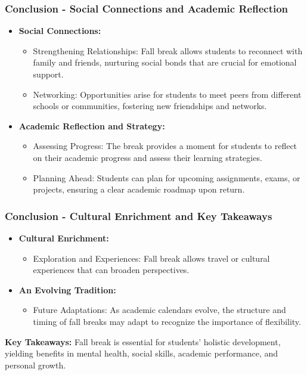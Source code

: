 \documentclass[aspectratio=169]{beamer}
\begin{document}
\begin{frame}[fragile]
    \frametitle{Conclusion - Social Connections and Academic Reflection}
    \begin{itemize}
        \item \textbf{Social Connections:}
        \begin{itemize}
            \item Strengthening Relationships: Fall break allows students to reconnect with family and friends, nurturing social bonds that are crucial for emotional support.
            \item Networking: Opportunities arise for students to meet peers from different schools or communities, fostering new friendships and networks.
        \end{itemize}
        
        \item \textbf{Academic Reflection and Strategy:}
        \begin{itemize}
            \item Assessing Progress: The break provides a moment for students to reflect on their academic progress and assess their learning strategies.
            \item Planning Ahead: Students can plan for upcoming assignments, exams, or projects, ensuring a clear academic roadmap upon return.
        \end{itemize}
    \end{itemize}
\end{frame}

\begin{frame}[fragile]
    \frametitle{Conclusion - Cultural Enrichment and Key Takeaways}
    \begin{itemize}
        \item \textbf{Cultural Enrichment:}
        \begin{itemize}
            \item Exploration and Experiences: Fall break allows travel or cultural experiences that can broaden perspectives.
        \end{itemize}
        
        \item \textbf{An Evolving Tradition:}
        \begin{itemize}
            \item Future Adaptations: As academic calendars evolve, the structure and timing of fall breaks may adapt to recognize the importance of flexibility.
        \end{itemize}
    \end{itemize}
    
    \textbf{Key Takeaways:} Fall break is essential for students' holistic development, yielding benefits in mental health, social skills, academic performance, and personal growth.
\end{frame}
\end{document}
